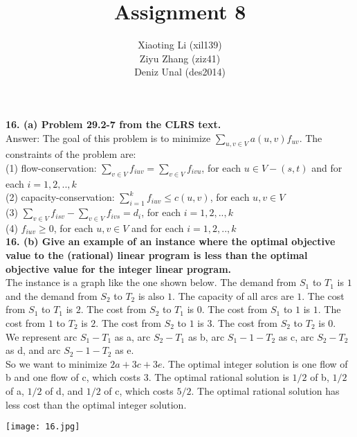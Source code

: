 \documentclass{article}
\title{Assignment 8}
\author{Xiaoting Li (xil139) \\
Ziyu Zhang (ziz41) \\
Deniz Unal (des2014)}
\date{}
\begin{document}
\maketitle

\noindent
\textbf{16. (a) Problem 29.2-7 from the CLRS text.} \\ \newline
\noindent
Answer: The goal of this problem is to minimize $\sum_{u, v \in V} a(u, v)f_{uv}$. The constraints of the problem are: \\
(1) flow-conservation: 
$\sum_{v\in V}f_{iuv} = \sum_{v\in V}f_{ivu}$, for each $u \in V - (s, t)$ and for each $i = 1, 2,.., k$\\
(2) capacity-conservation: 
$\sum_{i=1}^{k}f_{iuv} \leq c(u, v)$, for each $u, v \in V$\\
(3) $\sum_{v\in V}f_{isv} - \sum_{v\in V}f_{ivs} = d_{i}$, for each $i = 1, 2,.., k$\\
(4) $f_{iuv} \geq 0$, for each $u, v \in V$ and for each $i = 1, 2,.., k$\\

\noindent
\textbf{16. (b) Give an example of an instance where the optimal objective value to the (rational) linear program is less than the optimal objective value for the integer linear program.}\\\newline
The instance is a graph like the one shown below. The demand from $S_1$ to $T_1$ is $1$ and the demand from $S_2$ to $T_2$ is also $1$. The capacity of all arcs are $1$. The cost from $S_1$ to $T_1$ is $2$. The cost from $S_2$ to $T_1$ is $0$. The cost from $S_1$ to $1$ is $1$. The cost from $1$ to $T_2$ is $2$. The cost from $S_2$ to $1$ is $3$. The cost from $S_2$ to $T_2$ is $0$. \\ \newline
We represent arc $S_1-T_1$ as a, arc $S_2-T_1$ as b, arc $S_1-1-T_2$ as c, arc $S_2-T_2$ as d, and arc $S_2-1-T_2$ as e. \\ \newline
So we want to minimize $2a + 3c + 3e$. The optimal integer solution is one flow of b and one flow of c, which costs 3. The optimal rational solution is $1/2$ of b, $1/2$ of a, $1/2$ of d, and $1/2$ of c, which costs $5/2$. The optimal rational solution has less cost than the optimal integer solution. \\ \newline 

\texttt{[image: 16.jpg]}
\end{document}
